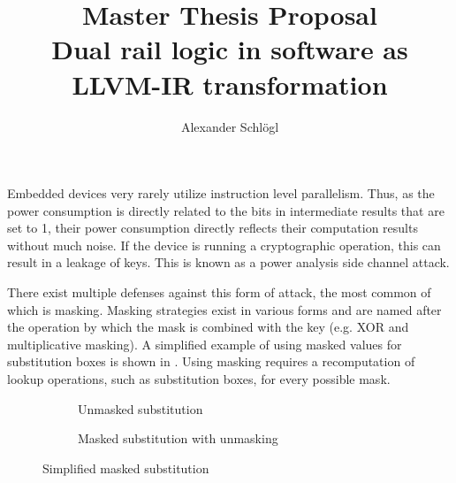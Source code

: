 \documentclass{article}
\title{%
  Master Thesis Proposal\\
  \large Dual rail logic in software as LLVM-IR transformation}
\author{Alexander Schl\"ogl}
\begin{document}
\maketitle

Embedded devices very rarely utilize instruction level parallelism.
Thus, as the power consumption is directly related to the bits in intermediate results that are set to 1, their power consumption directly reflects their computation results without much noise.
If the device is running a cryptographic operation, this can result in a leakage of keys.
This is known as a power analysis side channel attack. \cite{kocher1999differential}

There exist multiple defenses against this form of attack, the most common of which is masking\cite{messerges2000securing}.
Masking strategies exist in various forms and are named after the operation by which the mask is combined with the key (e.g. XOR and multiplicative masking).
A simplified example of using masked values for substitution boxes is shown in .
Using masking requires a recomputation of lookup operations, such as substitution boxes, for every possible mask.

\begin{figure}[h]
  \centering
  \begin{subfigure}[b]{0.45\textwidth}
    \centering
    \caption{Unmasked substitution}
  \end{subfigure}
  \hfill
  \begin{subfigure}[b]{0.45\textwidth}
    \centering
    \caption{Masked substitution with unmasking}
  \end{subfigure}

  \caption{Simplified masked substitution}
  \label{fig:masking}
\end{figure}
\end{document}
